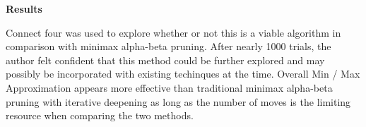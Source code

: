 \documentclass[10pt, a4paper]{article}
\begin{document}
\textbf{Results} 

Connect four was used to explore whether or not this is a viable algorithm in comparison
with minimax alpha-beta pruning.  After nearly 1000 trials, the author felt confident
that this method could be further explored and may possibly be incorporated with existing
techinques at the time. Overall Min / Max Approximation appears more effective than traditional 
minimax alpha-beta pruning with iterative deepening as long as the number of moves 
is the limiting resource when comparing the two methods.
\end{document}
